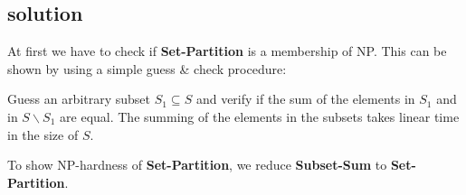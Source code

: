 % 
% 
% 
% 
% 
% 
% 

\subsection{solution}
\hfill \newline
At first we have to check if \textbf{Set-Partition} is a membership of NP.%
\newline
This can be shown by using a simple guess \& check procedure:\newline

Guess an arbitrary subset $S_1\subseteq S$ and verify if the sum of the
elements in $S_1$ and in $S\backslash S_1$ are equal. The summing of the
elements in the subsets takes linear time in the size of $S$.

To show NP-hardness of \textbf{Set-Partition}, we reduce \textbf{Subset-Sum} to \textbf{Set-Partition}.

